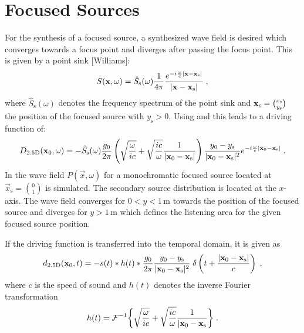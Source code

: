 \documentclass{article}
\begin{document}
\section{Focused Sources}

For the synthesis of a focused source, a synthesized wave field is desired which
converges towards a focus point and diverges after passing the focus point.
This is given by a point sink [Williams]:
\begin{equation} 
    S( \mathbf{x} ,\omega) = 
    \hat{S}_\text{s}(\omega)
    \frac{1}{4\pi} \frac{e^{-i \frac{\omega}{c} | \mathbf{x} - \mathbf{x} _\text{s}|}}{| \mathbf{x} - \mathbf{x} _\text{s}|}
    \;, 
\end{equation}
where $\hat{S}_\text{s}(\omega)$ denotes the frequency spectrum of the point
sink and $ \mathbf{x} _\text{s} = \binom{x_\text{s}}{y_\text{s}}$ the position of the
focused source with $y_\text{s} > 0$.
Using  and  this leads to a driving function of:
\begin{equation}
    D_{\text{2.5D}}( \mathbf{x} _0,\omega) = -\hat{S}_\text{s}(\omega)
    \frac{g_0}{2\pi}
    \left( \sqrt{\frac{\omega}{ic}} + \sqrt{\frac{ic}{\omega}} 
    \frac{1}{| \mathbf{x} _0- \mathbf{x} _\text{s}|} \right)
    \frac{y_0-y_\text{s}}{| \mathbf{x} _0- \mathbf{x} _\text{s}|^{2}} 
    e^{-i \frac{\omega}{c} | \mathbf{x} _0- \mathbf{x} _\text{s}|}
    \;.
    \label{eq:Dfs}
\end{equation}
In  the wave field $P(\vec{x},\omega)$ for
a monochromatic focused
source located at $\vec{x}_\text{s} = \binom{0}{1}$ is simulated. The secondary
source distribution is located at the $x$-axis. The wave field converges for
$0<y<1$\,m towards the position of the focused source and diverges for $y>1$\,m
which defines the listening area for the given focused source position.

If the driving function 
is transferred into the temporal domain,
it is given as
\begin{equation}
    d_{\text{2.5D}}( \mathbf{x} _0,t) = -s(t) * h(t) *
    \frac{g_0}{2\pi}
    \frac{y_0 - y_\text{s}}{| \mathbf{x} _0- \mathbf{x} _\text{s}|^{2}}
    \;\delta\left(t + \frac{| \mathbf{x} _0- \mathbf{x} _\text{s}|}{c}\right)
    \;,
\label{eq:d}
\end{equation}
where $c$ is the speed of sound and
$h(t)$ denotes the inverse Fourier transformation
\begin{equation} 
    h(t) =
    \mathcal{F}^{-1}{\biggl\{ \sqrt{\frac{\omega}{ic}} + \sqrt{\frac{ic}{\omega}}
    \frac{1}{| \mathbf{x} _0- \mathbf{x} _\text{s}} \biggr\}} 
    \;.
    \label{eq:h}
\end{equation}
\end{document}
